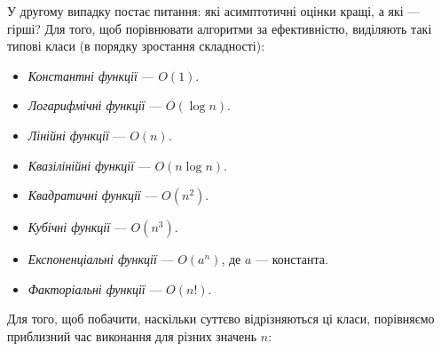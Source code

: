 \documentclass[12pt,a4paper]{report}
\begin{document}
У другому випадку постає питання: які асимптотичні оцінки кращі, а які --- гірші? Для того, щоб порівнювати алгоритми за ефективністю, виділяють такі типові класи (в порядку зростання складності):

\begin{itemize}
    \item \emph{Константні функції} --- \(O(1)\).
    \item \emph{Логарифмічні функції} --- \(O(\log{}n)\).
    \item \emph{Лінійні функції} --- \(O(n)\).
    \item \emph{Квазілінійні функції} --- \(O(n\log{}n)\).
    \item \emph{Квадратичні функції} --- \(O(n^2)\).
    \item \emph{Кубічні функції} --- \(O(n^3)\).
    \item \emph{Експоненціальні функції} --- \(O(a^n)\), де \(a\) --- константа.
    \item \emph{Факторіальні функції} --- \(O(n!)\).
\end{itemize}

Для того, щоб побачити, наскільки суттєво відрізняються ці класи, порівняємо приблизний час виконання для різних значень \(n\):
\end{document}
